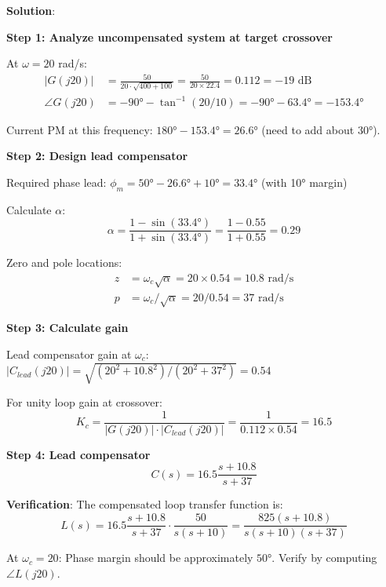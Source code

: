 \textbf{Solution}:

\textbf{Step 1: Analyze uncompensated system at target crossover}

At $\omega = 20$ rad/s:
\begin{align}
|G(j20)| &= \frac{50}{20 \cdot \sqrt{400 + 100}} = \frac{50}{20 \times 22.4} = 0.112 = -19 \text{ dB} \\
\angle G(j20) &= -90° - \tan^{-1}(20/10) = -90° - 63.4° = -153.4°
\end{align}

Current PM at this frequency: $180° - 153.4° = 26.6°$ (need to add about 30°).

\textbf{Step 2: Design lead compensator}

Required phase lead: $\phi_m = 50° - 26.6° + 10° = 33.4°$ (with 10° margin)

Calculate $\alpha$:
\begin{equation}
\alpha = \frac{1 - \sin(33.4°)}{1 + \sin(33.4°)} = \frac{1 - 0.55}{1 + 0.55} = 0.29
\end{equation}

Zero and pole locations:
\begin{align}
z &= \omega_c \sqrt{\alpha} = 20 \times 0.54 = 10.8 \text{ rad/s} \\
p &= \omega_c / \sqrt{\alpha} = 20 / 0.54 = 37 \text{ rad/s}
\end{align}

\textbf{Step 3: Calculate gain}

Lead compensator gain at $\omega_c$: $|C_{lead}(j20)| = \sqrt{(20^2 + 10.8^2)/(20^2 + 37^2)} = 0.54$

For unity loop gain at crossover:
\begin{equation}
K_c = \frac{1}{|G(j20)| \cdot |C_{lead}(j20)|} = \frac{1}{0.112 \times 0.54} = 16.5
\end{equation}

\textbf{Step 4: Lead compensator}
\begin{equation}
C(s) = 16.5 \frac{s + 10.8}{s + 37}
\end{equation}

\textbf{Verification}: The compensated loop transfer function is:
\begin{equation}
L(s) = 16.5 \frac{s + 10.8}{s + 37} \cdot \frac{50}{s(s + 10)} = \frac{825(s + 10.8)}{s(s + 10)(s + 37)}
\end{equation}

At $\omega_c = 20$: Phase margin should be approximately $50°$. Verify by computing $\angle L(j20)$.

